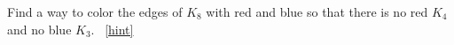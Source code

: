 \documentclass{book}
\begin{document}
\setcounter{project}{50}
\addtocounter{project}{-1}
\begin{activity}[]\label{activity-43}
\hypertarget{p-441}{}%
Find a way to color the edges of \(K_8\) with red and blue so that there is no red \(K_4\) and no blue \(K_3\).%
~\hfill{\tiny\hyperlink{a-50}{[hint]}\hypertarget{q-50}{}}\end{activity}
\end{document}
